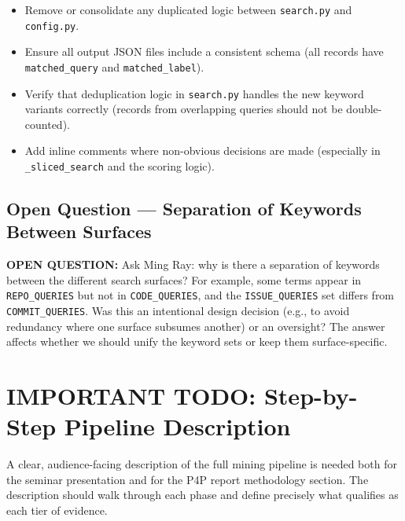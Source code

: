\documentclass[12pt,a4paper]{article}
\newenvironment{open}{\begin{mdframed}[linecolor=opencolor,linewidth=1pt]\textbf{\color{opencolor}OPEN QUESTION: }}{\end{mdframed}}
\begin{document}
\begin{itemize}
  \item Remove or consolidate any duplicated logic between \texttt{search.py}
        and \texttt{config.py}.
  \item Ensure all output JSON files include a consistent schema (all records
        have \texttt{matched\_query} and \texttt{matched\_label}).
  \item Verify that deduplication logic in \texttt{search.py} handles the new
        keyword variants correctly (records from overlapping queries should
        not be double-counted).
  \item Add inline comments where non-obvious decisions are made (especially
        in \texttt{\_sliced\_search} and the scoring logic).
\end{itemize}

\subsection{Open Question --- Separation of Keywords Between Surfaces}

\begin{open}
Ask Ming Ray: why is there a separation of keywords between the different
search surfaces? For example, some terms appear in \texttt{REPO\_QUERIES} but
not in \texttt{CODE\_QUERIES}, and the \texttt{ISSUE\_QUERIES} set differs from
\texttt{COMMIT\_QUERIES}. Was this an intentional design decision (e.g., to
avoid redundancy where one surface subsumes another) or an oversight? The
answer affects whether we should unify the keyword sets or keep them surface-specific.
\end{open}

\section{IMPORTANT TODO: Step-by-Step Pipeline Description}
\label{sec:pipeline}

A clear, audience-facing description of the full mining pipeline is needed both
for the seminar presentation and for the P4P report methodology section. The
description should walk through each phase and define precisely what qualifies
as each tier of evidence.
\end{document}
